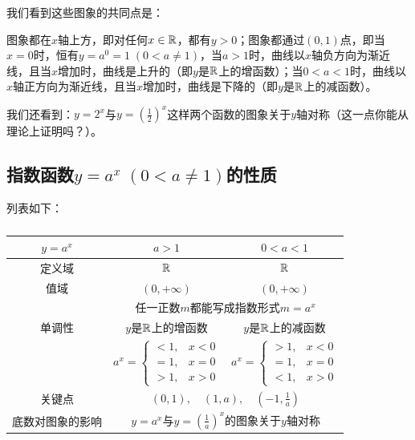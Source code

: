 \begin{figure}[htp]
     \centering
     \caption{}
 \end{figure}
 
 
 我们看到这些图象的共同点是：
 
 图象都在$x$轴上方，即对任何$x\in\mathbb{R}$，都有$y>0$；图象都通过$(0,1)$点，即当$x=0$时，恒有$y=a^0=1\; (0<a\ne 1)$，当$a>1$时，曲线以$x$轴负方向为渐近线，且当$x$增加时，曲线是上升的（即$y$是$\mathbb{R}$上的增函数）；当$0<a<1$时，曲线以$x$轴正方向为渐近线，且当$x$增加时，曲线是下降的（即$y$是$\mathbb{R}$上的减函数）。
 
 我们还看到：$y=2^x$与$y=\left(\frac{1}{2}\right)^x$这样两个函数的图象关于$y$轴对称（这一点你能从理论上证明吗？）。
 
 \subsection{指数函数$y=a^x\; (0<a\ne 1)$的性质}
 列表如下：
 \begin{table}[htp]
     \caption{}
     \centering
 \begin{tabular}{c|cc}
     \hline
 $y=a^x$ & $a>1$&$0<a<1$        \\
 \hline
 定义域 & $\mathbb{R}$ & $\mathbb{R}$\\
 值域 & $(0,+\infty)$& $(0,+\infty)$\\
 &\multicolumn{2}{c}{任一正数$m$都能写成指数形式$m=a^x$}\\
 单调性& $y$是$\mathbb{R}$上的增函数& $y$是$\mathbb{R}$上的减函数\\
 & $a^x=\begin{cases}
     <1,& x<0\\
     =1,& x=0\\
     >1,& x>0
 \end{cases}$  & $a^x=\begin{cases}
     >1,& x<0\\
     =1,& x=0\\
     <1,& x>0
 \end{cases}$\\
 关键点&\multicolumn{2}{c}{$(0,1),\quad (1,a),\quad \left(-1,\frac{1}{a}\right)$}\\
 底数对图象的影响&\multicolumn{2}{c}{$y=a^x$与$y=\left(\frac{1}{a}\right)^x$的图象关于$y$轴对称}\\
 \hline
 \end{tabular}
 \end{table}
 
